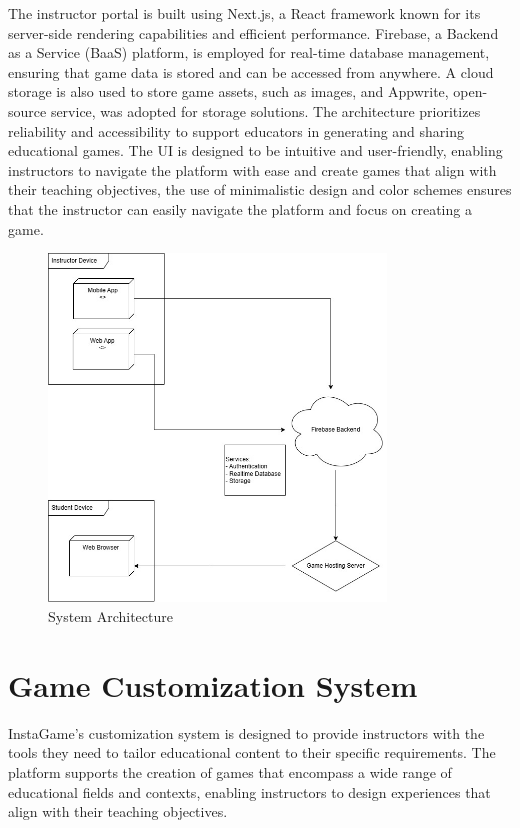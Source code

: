 The instructor portal is built using Next.js, a React framework known for its server-side rendering capabilities and efficient performance. Firebase, a Backend as a Service (BaaS) platform, is employed for real-time database management, ensuring that game data is stored and can be accessed from anywhere. A cloud storage is also used to store game assets, such as images, and Appwrite, open-source service, was adopted for storage solutions. The architecture prioritizes reliability and accessibility to support educators in generating and sharing educational games. The UI is designed to be intuitive and user-friendly, enabling instructors to navigate the platform with ease and create games that align with their teaching objectives, the use of minimalistic design and color schemes ensures that the instructor can easily navigate the platform and focus on creating a game.

\begin{figure}
	\centering
	\includegraphics[width=0.8\textwidth]{figures/Deployment_UML.jpg}
	\caption{System Architecture}
	\label{fig:architecture}
\end{figure}

\section{Game Customization System}

InstaGame’s customization system is designed to provide instructors with the tools they need to tailor educational content to their specific requirements. The platform supports the creation of games that encompass a wide range of educational fields and contexts, enabling instructors to design experiences that align with their teaching objectives.

